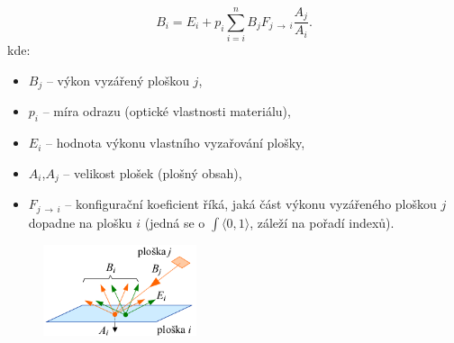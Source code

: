 \begin{equation*}
	B_i = E_i + p_i \sum\limits_{i=i}^n B_j F_{j \,\to\, i} \frac{A_j}{A_i}.
\end{equation*}
kde: 
\begin{itemize}
\item $B_j$ -- výkon vyzářený ploškou $j$,
\item $p_i$ -- míra odrazu (optické vlastnosti materiálu),
\item $E_i$ -- hodnota výkonu vlastního vyzařování plošky,
\item $A_i$,$A_j$ -- velikost plošek (plošný obsah),
\item $F_{j \,\to\, i}$ -- konfigurační koeficient říká, jaká část výkonu vyzářeného ploškou $j$ dopadne na plošku $i$ (jedná se o $\int \langle0,1\rangle$, záleží na pořadí indexů).
\end{itemize}
\begin{figure}[H]
\centering
\includegraphics[width=0.4\textwidth]{assets/6_vyzarovaci_metoda}
\end{figure}

